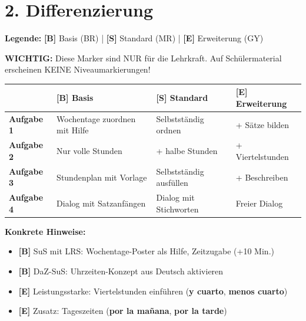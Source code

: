 \documentclass[11pt, a4paper]{article}
\newcommand{\fachfarbe}{spanisch}
\newcommand{\B}{\textcolor{basis}{\textbf{[B]}}}
\newcommand{\Std}{\textcolor{standard}{\textbf{[S]}}}
\newcommand{\E}{\textcolor{erweiterung}{\textbf{[E]}}}
\newcommand{\es}[1]{\textcolor{\fachfarbe}{\textbf{#1}}}
\begin{document}

\section*{2. Differenzierung}

\begin{differenzierung}
\textbf{Legende:} \B{} Basis (BR) | \Std{} Standard (MR) | \E{} Erweiterung (GY)

\vspace{0.5em}

\textbf{WICHTIG:} Diese Marker sind NUR für die Lehrkraft. Auf Schülermaterial erscheinen KEINE Niveaumarkierungen!
\end{differenzierung}

\vspace{1em}

\begin{tabularx}{\textwidth}{|l|X|X|X|}
\hline
& \B{} \textbf{Basis} & \Std{} \textbf{Standard} & \E{} \textbf{Erweiterung} \\
\hline
\textbf{Aufgabe 1} & Wochentage zuordnen mit Hilfe & Selbstständig ordnen & + Sätze bilden \\
\hline
\textbf{Aufgabe 2} & Nur volle Stunden & + halbe Stunden & + Viertelstunden \\
\hline
\textbf{Aufgabe 3} & Stundenplan mit Vorlage & Selbstständig ausfüllen & + Beschreiben \\
\hline
\textbf{Aufgabe 4} & Dialog mit Satzanfängen & Dialog mit Stichworten & Freier Dialog \\
\hline
\end{tabularx}

\vspace{1em}

\textbf{Konkrete Hinweise:}
\begin{itemize}
    \item \B{} SuS mit LRS: Wochentage-Poster als Hilfe, Zeitzugabe (+10 Min.)
    \item \B{} DaZ-SuS: Uhrzeiten-Konzept aus Deutsch aktivieren
    \item \E{} Leistungsstarke: Viertelstunden einführen (\es{y cuarto}, \es{menos cuarto})
    \item \E{} Zusatz: Tageszeiten (\es{por la mañana}, \es{por la tarde})
\end{itemize}
\end{document}
